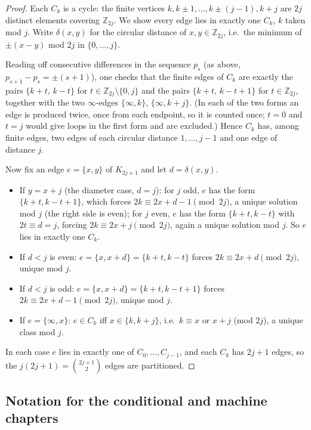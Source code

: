 \begin{proof}
Each $C_k$ is a cycle: the finite vertices $k, k\pm1,\dots,k\pm(j-1),k+j$ are $2j$ distinct
elements covering $\mathbb{Z}_{2j}$. We show every edge lies in exactly one $C_k$, $k$ taken
mod $j$. Write $\delta(x,y)$ for the circular distance of $x,y\in\mathbb{Z}_{2j}$, i.e.\ the
minimum of $\pm(x-y)$ mod $2j$ in $\{0,\dots,j\}$.

Reading off consecutive differences in the sequence $p_s$ (as above, $p_{s+1}-p_s=\pm(s+1)$),
one checks that the finite edges of $C_k$ are exactly the pairs
$\{k+t,\,k-t\}$ for $t\in\mathbb{Z}_{2j}\setminus\{0,j\}$ and the pairs
$\{k+t,\,k-t+1\}$ for $t\in\mathbb{Z}_{2j}$, together with the two $\infty$-edges
$\{\infty,k\}$, $\{\infty,k+j\}$. (In each of the two forms an edge is produced twice, once
from each endpoint, so it is counted once; $t=0$ and $t=j$ would give loops in the first form
and are excluded.) Hence $C_k$ has, among finite edges, two edges of each circular distance
$1,\dots,j-1$ and one edge of distance $j$.

Now fix an edge $e=\{x,y\}$ of $K_{2j+1}$ and let $d=\delta(x,y)$.
\begin{itemize}[leftmargin=1.5em]
\item If $y=x+j$ (the diameter case, $d=j$): for $j$ odd, $e$ has the form $\{k+t,k-t+1\}$,
which forces $2k\equiv 2x+d-1\pmod{2j}$, a unique solution mod $j$ (the right side is even);
for $j$ even, $e$ has the form $\{k+t,k-t\}$ with $2t\equiv d=j$, forcing
$2k\equiv 2x+j\pmod{2j}$, again a unique solution mod $j$. So $e$ lies in exactly one $C_k$.
\item If $d<j$ is even: $e=\{x,x+d\}=\{k+t,k-t\}$ forces $2k\equiv 2x+d\pmod{2j}$, unique
mod $j$.
\item If $d<j$ is odd: $e=\{x,x+d\}=\{k+t,k-t+1\}$ forces $2k\equiv 2x+d-1\pmod{2j}$, unique
mod $j$.
\item If $e=\{\infty,x\}$: $e\in C_k$ iff $x\in\{k,k+j\}$, i.e.\ $k\equiv x$ or $x+j$
(mod $2j$), a unique class mod $j$.
\end{itemize}
In each case $e$ lies in exactly one of $C_0,\dots,C_{j-1}$, and each $C_k$ has $2j+1$ edges,
so the $j(2j+1)=\binom{2j+1}{2}$ edges are partitioned.
\end{proof}

\subsection{Notation for the conditional and machine chapters}\label{subsec:machnotation}

